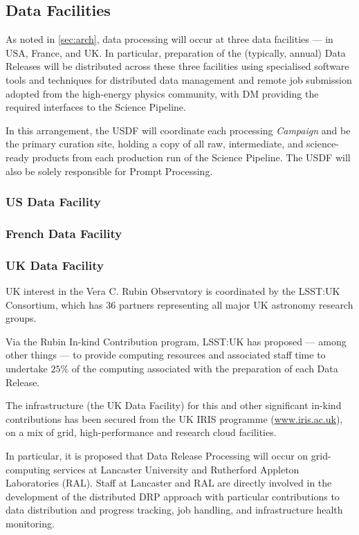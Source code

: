 \subsection{Data Facilities} \label{sec:datafacilities}

As noted in \autoref{sec:arch}, data processing will occur at three data facilities --- in USA, France, and UK. In particular, preparation of the (typically, annual) Data Releases will be distributed across these three facilities using specialised software tools and techniques for distributed data management and remote job submission adopted from the high-energy physics community, with DM providing the required interfaces to the Science Pipeline.

In this arrangement, the USDF will coordinate each processing {\em Campaign} and be the primary curation site, holding a copy of all raw, intermediate, and science-ready products from each production run of the Science Pipeline. The USDF will also be solely responsible for Prompt Processing.

\subsubsection{US Data Facility} \label{sec:usdf}

\subsubsection{French Data Facility} \label{sec:frdf}

\subsubsection{UK Data Facility} \label{sec:ukdf}

UK interest in the Vera C. Rubin Observatory is coordinated by the LSST:UK Consortium, which has 36 partners representing all major UK astronomy research groups.

Via the Rubin In-kind Contribution program, LSST:UK has proposed --- among other things --- to provide computing resources and associated staff time to undertake $25\%$ of the computing associated with the preparation of each Data Release.

The infrastructure (the UK Data Facility) for this and other significant in-kind contributions has been secured from the UK IRIS programme (\url{www.iris.ac.uk}), on a mix of grid, high-performance and research cloud facilities.

In particular, it is proposed that Data Release Processing will occur on grid-computing services at Lancaster University and Rutherford Appleton Laboratories (RAL). Staff at Lancaster and RAL are directly involved in the development of the distributed DRP approach with particular contributions to data distribution and progress tracking, job handling, and infrastructure health monitoring.

